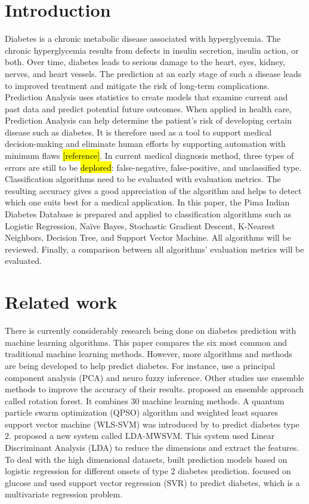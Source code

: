 \documentclass[11pt]{article}
\begin{document}
	\section{Introduction}
	Diabetes is a chronic metabolic disease associated with hyperglycemia. The chronic hyperglycemia results from defects in insulin secretion, insulin action, or both. Over time, diabetes leads to serious damage to the heart, eyes, kidney, nerves, and heart vessels. The prediction at an early stage of such a disease leads to improved treatment and mitigate the risk of long-term complications. Prediction Analysis uses statistics to create models that examine current and past data and predict potential future outcomes. When applied in health care, Prediction Analysis can help determine the patient’s risk of developing certain disease such as diabetes. It is therefore used as a tool to support medical decision-making and eliminate human efforts by supporting automation with minimum flaws \hl{[reference]}. In current medical diagnosis method, three types of errors are still to be \hl{deplored}: false-negative, false-positive, and unclassified type.	
	\bigbreak
	Classification algorithms need to be evaluated with evaluation metrics. The resulting accuracy gives a good appreciation of the algorithm and helps to detect which one suits best for a medical application. In this paper, the Pima Indian Diabetes Database \cite{Pima} is prepared and applied to classification algorithms such as Logistic Regression, Naïve Bayes, Stochastic Gradient Descent, K-Nearest Neighbors, Decision Tree, and Support Vector Machine. All algorithms will be reviewed. Finally, a comparison between all algorithms’ evaluation metrics will be evaluated.
	
	\section{Related work}
	There is currently considerably research being done on diabetes prediction with machine learning algorithms. This paper compares the six most common and traditional machine learning methods. However, more algorithms and methods are being developed to help predict diabetes. For instance, \citeauthor{POLAT2007702} \cite{POLAT2007702} use a principal component analysis (PCA) and neuro fuzzy inference. Other studies use ensemble methods to improve the accuracy of their results. \citeauthor{OZCIFT2011443} \cite{OZCIFT2011443} proposed an ensemble approach called rotation forest. It combines 30 machine learning methods. A quantum particle swarm optimization (QPSO) algorithm and weighted least squares support vector machine (WLS-SVM) was introduced by \citeauthor{Chen} to predict diabetes type 2. \citeauthor{Duygu} \cite{Duygu} proposed a new system called LDA-MWSVM. This system used Linear Discriminant Analysis (LDA) to reduce the dimensions and extract the features. To deal with the high dimensional datasets, \citeauthor{Razavian} \cite{Razavian} built prediction models based on logistic regression for different onsets of type 2 diabetes prediction. \citeauthor{Georga} \cite{Georga} focused on glucose and used support vector regression (SVR) to predict diabetes, which is a multivariate regression problem.
\end{document}
